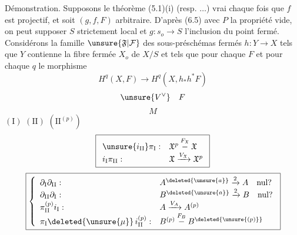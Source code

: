 Démonstration. Supposons le théorème (5.1)(i) (resp. $\ldots$) vrai chaque fois que $f$ est projectif, et soit $(g,f,F)$ arbitraire. D'après (6.5) avec $P$ la propriété vide, on peut supposer $S$ strictement local et $g:s_o\longrightarrow S$ l'inclusion du point fermé. Considérons la famille $\unsure{\mathfrak F|\mathcal F}$ des sous-préschémas fermés $h:Y\longrightarrow X$ tels que $Y$ contienne la fibre fermée $X_o$ de $X/S$ et tels que pour chaque $F$ et pour chaque $q$  le morphisme
\[
H^q(X,F)\longrightarrow H^q(X,h_*h^*F)
\]
\[
\unsure{V^\vee}\quad F
\]
\[
M
\]
$(\mathrm I)$
$(\mathrm {II})$
$(\mathrm {II}^{(p)})$
\[
\boxed{\begin{array}{ll}
\unsure{i_{\mathrm {II}}}\pi_{\mathrm I}:&\mathfrak X^p\overset{F_{\mathfrak X}}{\mathbin{-}}\mathfrak X\\
i_{\mathrm I}\pi_{\mathrm {II}}:&\mathfrak X\xrightarrow{V_{\mathfrak X}}\mathfrak X^p
\end{array}}
\]
\[
\boxed{\left\{\begin{array}{ll}
\partial_{\mathrm I}\partial_{\mathrm {II}}:&A^{\deleted{\unsure{a}}}\xrightarrow{2}A\quad\text{nul?}\\
\partial_{\mathrm {II}}\partial_{\mathrm I}:&B^{\deleted{\unsure{a}}}\xrightarrow{2}B\quad\text{nul?}\\
\pi_{\mathrm {II}}^{(p)}i_{\mathrm I}:&A\xrightarrow{V_A}A^{(p)}\\
\pi_{\mathrm I}\deleted{\unsure{\mu}}\,i_{\mathrm {II}}^{(p)}:&B^{(p)}\overset{F_B}{\mathbin{-}}B^{\deleted{\unsure{(p)}}}
\end{array}\right.}
\]
